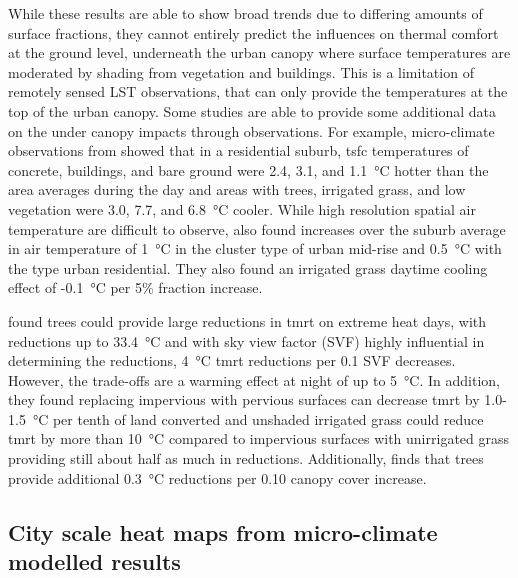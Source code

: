 \documentclass[final,3p,times,authoryear]{elsarticle}
\begin{document}
While these results are able to show broad trends due to differing amounts of surface fractions, they cannot entirely predict the influences on thermal comfort at the ground level, underneath the urban canopy where surface temperatures are moderated by shading from vegetation and buildings. This is a limitation of remotely sensed LST observations, that can only provide the temperatures at the top of the urban canopy. Some studies are able to provide some additional data on the under canopy impacts through observations. For example, micro-climate observations from \cite{Broadbent2017a} showed that in a residential suburb, \gls{tsfc} temperatures of concrete, buildings, and bare ground were 2.4, 3.1, and 1.1\SI{}{\degreeCelsius} hotter than the area averages during the day and areas with trees, irrigated grass, and low vegetation were 3.0, 7.7, and 6.8\SI{}{\degreeCelsius} cooler. While high resolution spatial air temperature are difficult to observe, \cite{Broadbent2017a} also found increases over the suburb average in air temperature of 1\SI{}{\degreeCelsius} in the cluster type of urban mid-rise and 0.5\SI{}{\degreeCelsius} with the type urban residential. They also found an irrigated grass daytime cooling effect of -0.1\SI{}{\degreeCelsius} per 5\% fraction increase.

\cite{Middel2019a} found trees could provide large reductions in \gls{tmrt} on extreme heat days, with reductions up to 33.4\SI{}{\degreeCelsius} and with sky view factor (SVF) highly influential in determining the reductions, 4\SI{}{\degreeCelsius} \gls{tmrt} reductions per 0.1 SVF decreases. However, the trade-offs are a warming effect at night of up to 5\SI{}{\degreeCelsius}. In addition, they found replacing impervious with pervious surfaces can decrease \gls{tmrt} by 1.0-1.5\SI{}{\degreeCelsius} per tenth of land converted and unshaded irrigated grass could reduce \gls{tmrt} by more than 10\SI{}{\degreeCelsius} compared to impervious surfaces with unirrigated grass providing still about half as much in reductions. Additionally, \cite{Krayenhoff2021} finds that trees provide additional 0.3\SI{}{\degreeCelsius} reductions per 0.10 canopy cover increase.

\subsection{City scale heat maps from micro-climate modelled results}\label{sec:resultsheatmaps}
\end{document}
